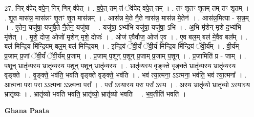 \documentclass[17pt]{extarticle}
\begin{document}
27. निर् व॑पेद् वपे॒न् निर् णिर् व॑पेत् । . व॒पे॒त् तम् तं ॅव॑पेद् वपे॒त् तम् । . तꣳ शृ॒तꣳ शृ॒तम् तम् तꣳ शृ॒तम् । . शृ॒त मास॑न्न॒ मास॑न्नꣳ शृ॒तꣳ शृ॒त मास॑न्नम् । . आस॑न्न मे॒ते नै॒ते नास॑न्न॒ मास॑न्न मे॒तेन॑ । . आस॑न्न॒मित्या - स॒न्न॒म् । . ए॒तेन॒ यजु॑षा॒ यजु॑षै॒ते नै॒तेन॒ यजु॑षा । . यजु॑षा॒ ऽभ्य॑भि यजु॑षा॒ यजु॑षा॒ ऽभि । . अ॒भि मृ॑शेन् मृशे द॒भ्य॑भि मृ॑शेत् । . मृ॒शे॒ दोज॒ ओजो॑ मृशेन् मृशे॒ दोजः॑ । . ओज॑ ए॒वैवौज॒ ओज॑ ए॒व । . ए॒व बल॒म् बल॑ मे॒वैव बल᳚म् । . बल॑ मिन्द्रि॒य मि॑न्द्रि॒यम् बल॒म् बल॑ मिन्द्रि॒यम् । . इ॒न्द्रि॒यं ॅवी॒र्यं॑ ॅवी॒र्य॑ मिन्द्रि॒य मि॑न्द्रि॒यं ॅवी॒र्य᳚म् । . वी॒र्य॑म् प्र॒जाम् प्र॒जां ॅवी॒र्यं॑ ॅवी॒र्य॑म् प्र॒जाम् । . प्र॒जाम् प॒शून् प॒शून् प्र॒जाम् प्र॒जाम् प॒शून् । . प्र॒जामिति॑ प्र - जाम् । . प॒शून् भ्रातृ॑व्यस्य॒ भ्रातृ॑व्यस्य प॒शून् प॒शून् भ्रातृ॑व्यस्य । . भ्रातृ॑व्यस्य वृङ्क्ते वृङ्क्ते॒ भ्रातृ॑व्यस्य॒ भ्रातृ॑व्यस्य वृङ्क्ते । . वृ॒ङ्क्ते॒ भव॑ति॒ भव॑ति वृङ्क्ते वृङ्क्ते॒ भव॑ति । . भव॑ त्या॒त्मना॒ ऽऽत्मना॒ भव॑ति॒ भव॑ त्या॒त्मना᳚ । . आ॒त्मना॒ परा॒ परा॒ ऽऽत्मना॒ ऽऽत्मना॒ परा᳚ । . परा᳚ ऽस्यास्य॒ परा॒ परा᳚ ऽस्य । . अ॒स्य॒ भ्रातृ॑व्यो॒ भ्रातृ॑व्यो ऽस्यास्य॒ भ्रातृ॑व्यः । . भ्रातृ॑व्यो भवति भवति॒ भ्रातृ॑व्यो॒ भ्रातृ॑व्यो भवति । . भ॒व॒तीति॑ भवति । \newline

\textbf{Ghana Paata } \newline
\end{document}

